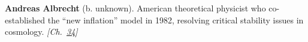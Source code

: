 \textbf{Andreas Albrecht} (b. unknown). American theoretical physicist who co-established the ``new inflation'' model in 1982, resolving critical stability issues in cosmology. \emph{[Ch.~\hyperref[ch:boltzmannbrain]{34}]}

